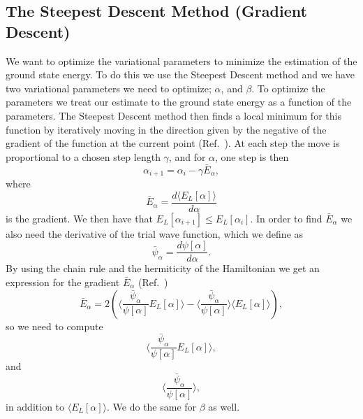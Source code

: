 \documentclass[../main.tex]{subfiles}
\begin{document}
\subsection{The Steepest Descent Method (Gradient Descent)}\label{sec:SteepestDescent}
We want to optimize the variational parameters to minimize the estimation of the ground state energy. To do this we use the Steepest Descent method and we have two variational parameters we need to optimize; $\alpha$, and $\beta$. To optimize the parameters we treat our estimate to the ground state energy as a function of the parameters. The Steepest Descent method then finds a local minimum for this function by iteratively moving in the direction given by the negative of the gradient of the function at the current point (Ref.~\cite{CG-wiki}). At each step the move is proportional to a chosen step length $\gamma$, and for $\alpha$, one step is then
\begin{equation}\label{eq: SteepestDesc}
    \alpha_{i+1} = \alpha_i - \gamma\bar{E}_\alpha,
\end{equation}
where
\begin{equation}
    \bar{E}_\alpha = \frac{d\langle E_L[\alpha]\rangle}{d\alpha}
\end{equation}
is the gradient. We then have that $E_L[\alpha_{i+1}]\leq E_L[\alpha_i]$. In order to find $\bar{E}_\alpha$ we also need the derivative of the trial wave function, which we define as
\begin{equation}
    \bar{\psi}_\alpha = \frac{d\psi[\alpha]}{d\alpha}.
\end{equation}
By using the chain rule and the hermiticity of the Hamiltonian we get an expression for the gradient $\bar{E}_\alpha$ (Ref.~\cite{FYS4411-CG})
\begin{equation}\label{eq: energygradient}
 \bar{E}_\alpha = 2 \left( \Bigr\langle \frac{\bar{\psi}_\alpha}{\psi[\alpha]} E_L[\alpha] \Bigr\rangle 
 - \Bigr\langle \frac{\bar{\psi}_\alpha}{\psi[\alpha]}\Bigr\rangle \langle E_L[\alpha] \rangle   \right),
\end{equation}
so we need to compute
\begin{equation}\label{eq: psiDerEn}
    \Bigr\langle \frac{\bar{\psi}_\alpha}{\psi[\alpha]} E_L[\alpha] \Bigr\rangle,
\end{equation}
and
\begin{equation}\label{eq: psiDer}
    \Bigr\langle \frac{\bar{\psi}_\alpha}{\psi[\alpha]}\Bigr\rangle,
\end{equation}
in addition to $\langle E_L[\alpha] \rangle$. We do the same for $\beta$ as well.
\end{document}
